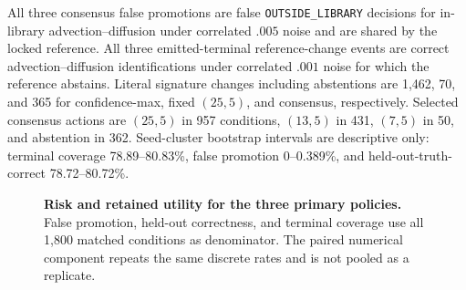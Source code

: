 \documentclass{article}
\newcommand{\OUT}{\texttt{OUTSIDE\_LIBRARY}\xspace}
\begin{document}
All three consensus false promotions are false \OUT decisions for in-library advection--diffusion
under correlated $.005$ noise and are shared by the locked reference. All three emitted-terminal
reference-change events are correct advection--diffusion identifications under correlated $.001$
noise for which the reference abstains. Literal signature changes including abstentions are
1,462, 70, and 365 for confidence-max, fixed $(25,5)$, and consensus, respectively. Selected
consensus actions are $(25,5)$ in 957 conditions, $(13,5)$ in
431, $(7,5)$ in 50, and abstention in 362. Seed-cluster bootstrap intervals are descriptive only:
terminal coverage 78.89--80.83\%, false promotion 0--0.389\%, and held-out-truth-correct 78.72--80.72\%.

\begin{figure}[ht]
\centering
\resizebox{\linewidth}{!}{}
\caption{\textbf{Risk and retained utility for the three primary policies.} False promotion,
held-out correctness, and terminal coverage use all 1,800 matched conditions as denominator. The
paired numerical component repeats the same discrete rates and is not pooled as a replicate.}
\label{fig:mitigation-utility}
\end{figure}

\clearpage
\end{document}
